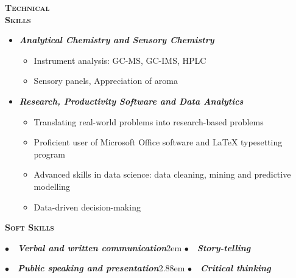 \documentclass[11pt, a4paper, twoside]{article}
\begin{document}
\vspace{3.5ex}
\begin{minipage}[t]{0.1\textwidth}
\textsc{\textbf{\Large Technical\\Skills}}
  \end{minipage}\hfill
  \begin{minipage}[t]{0.8\textwidth}
    \begin{itemize}[leftmargin=*]
    \setlength\itemsep{-0.5ex}
    \item {\large\textbf{\itshape Analytical Chemistry and Sensory Chemistry}}\vspace{-7pt}
        \begin{itemize}[label=\checkmark]
            \setlength\itemsep{-0.25ex}
            \item Instrument analysis: GC-MS, GC-IMS, HPLC
            \item Sensory panels, Appreciation of aroma
        \end{itemize}
    \item {\large\textbf{\itshape Research, Productivity Software and Data Analytics}}\\\vspace{-7pt}
    \begin{itemize}[label=\checkmark]
            \setlength\itemsep{-0.25ex}
            \item Translating real-world problems into research-based problems
            \item Proficient user of Microsoft Office software and LaTeX typesetting program
            \item Advanced skills in data science: data cleaning, mining and predictive modelling
            \item Data-driven decision-making
        \end{itemize}
    \end{itemize}
\end{minipage}\par
\vspace{6ex}
\begin{minipage}[t]{0.15\textwidth}
\textsc{\textbf{\Large Soft Skills}}
  \end{minipage}\hfill
  \begin{minipage}[t]{0.8\textwidth}
    $\bullet$~~{\large\textbf{\itshape Verbal and written communication}}\kern2em $\bullet$~~{\large\textbf{\itshape Story-telling}}\par\vspace{1ex}
    $\bullet$~~{\large\textbf{\itshape Public speaking and presentation}}\kern2.88em $\bullet$~~{\large\textbf{\itshape Critical thinking}}\par
\end{minipage}\par
\end{document}
